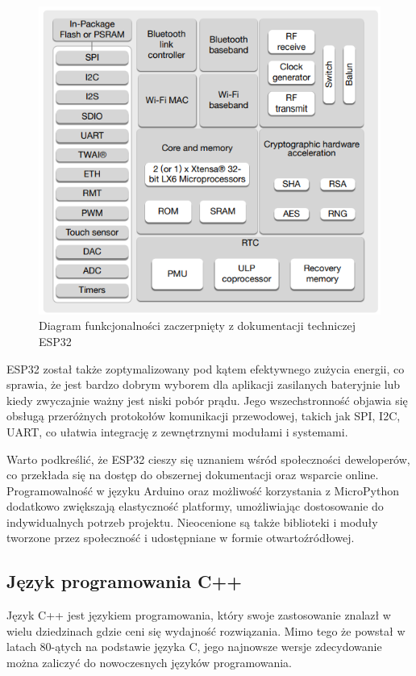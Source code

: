 \documentclass[12pt,twoside]{article}
\begin{document}
\begin{figure}[ht]
   \centering
   \includegraphics[width=12cm]{images/esp32_functional_diagram.png}
   \caption{Diagram funkcjonalności zaczerpnięty z dokumentacji techniczej ESP32\cite{esp32Datasheet}}
   \label{Fig:functionalDiagram}
\end{figure}

ESP32 został także zoptymalizowany pod kątem efektywnego zużycia energii, co sprawia, że jest bardzo dobrym
wyborem dla aplikacji zasilanych bateryjnie lub kiedy zwyczajnie ważny jest niski pobór prądu. Jego wszechstronność objawia
się obsługą przeróżnych protokołów komunikacji przewodowej,
takich jak SPI, I2C, UART, co ułatwia integrację z zewnętrznymi modułami i systemami.

Warto podkreślić, że ESP32 cieszy się uznaniem wśród społeczności deweloperów, co przekłada się na dostęp
do obszernej dokumentacji oraz wsparcie online. Programowalność w języku Arduino oraz możliwość korzystania
z MicroPython dodatkowo zwiększają elastyczność platformy, umożliwiając dostosowanie do indywidualnych potrzeb projektu.
Nieocenione są także biblioteki i moduły tworzone przez społeczność i udostępniane w formie otwartoźródłowej.
\subsection{Język programowania C++}
Język C++ jest językiem programowania, który swoje zastosowanie znalazł w wielu dziedzinach gdzie ceni się wydajność rozwiązania. Mimo tego że powstał w latach 80-ątych na podstawie języka C, jego najnowsze wersje zdecydowanie można zaliczyć do nowoczesnych języków programowania.
\end{document}

